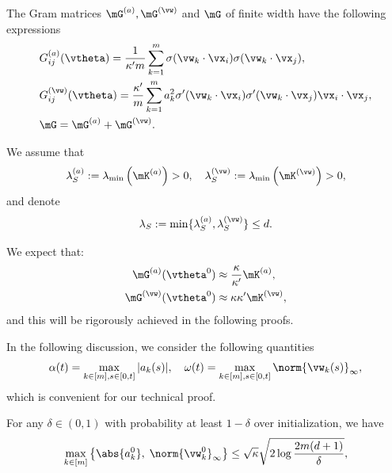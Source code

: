 \documentclass{article}
\begin{document}
\noindent The Gram matrices $\mG^{(a)},\mG^{(\vw)}$ and $\mG$ of finite width have the following expressions
\begin{equation}
    \begin{aligned}
         & G^{(a)}_{ij}(\vtheta)=\frac{1}{\kappa' m}\sum_{k=1}^m\sigma(\vw_k\cdot\vx_i)\sigma(\vw_k\cdot\vx_j),                        \\
         & G^{(\vw)}_{ij}(\vtheta)=\frac{\kappa'}{m}\sum_{k=1}^m a_k^2\sigma'(\vw_k\cdot\vx_i)\sigma'(\vw_k\cdot\vx_j)\vx_i\cdot\vx_j, \\
         & \mG=\mG^{(a)}+\mG^{(\vw)}.
    \end{aligned}
\end{equation}
\begin{assump}\label{assump:main}
    We assume that
    \begin{equation}
        \lambda_S^{(a)} := \lambda_{\min}\left(\mK^{(a)}\right) > 0,\quad \lambda_S^{(\vw)} := \lambda_{\min}\left(\mK^{(\vw)}\right) > 0,
    \end{equation}
    and denote
    \begin{equation}
        \lambda_S:=\min \{\lambda_S^{(a)},\lambda_S^{(\vw)}\}\leq d.
    \end{equation}
\end{assump}
\begin{rmk}
    We expect that:
    \begin{equation}
        \begin{aligned}
            \mG^{(a)}(\vtheta^0)   & \approx\frac{\kappa}{\kappa'}\mK^{(a)}, \\
            \mG^{(\vw)}(\vtheta^0) & \approx\kappa\kappa'\mK^{(\vw)},
        \end{aligned}
    \end{equation}
    and this will be rigorously achieved in the following proofs.
\end{rmk}
In the following discussion, we consider the following quantities
\begin{equation}
    \alpha(t)=\max\limits_{k\in[m],s\in[0,t]}|a_k(s)|, \quad \omega(t)=\max\limits_{k\in[m],s\in[0,t]}\norm{\vw_k(s)}_{\infty},
\end{equation}
which is convenient for our technical proof.
\begin{lem}\label{lem1}
    For any $\delta\in(0,1)$ with probability at least $1-\delta$ over initialization, we have
    \begin{equation}\label{eqn:lem1}
        \max\limits_{k\in[m]}\left\{\abs{a_k^0},\;\norm{\vw_k^0}_{\infty}\right \}\leq\sqrt{\kappa}\sqrt{2\log\frac{2m(d+1)}{\delta}},
    \end{equation}
\end{lem}
\end{document}
